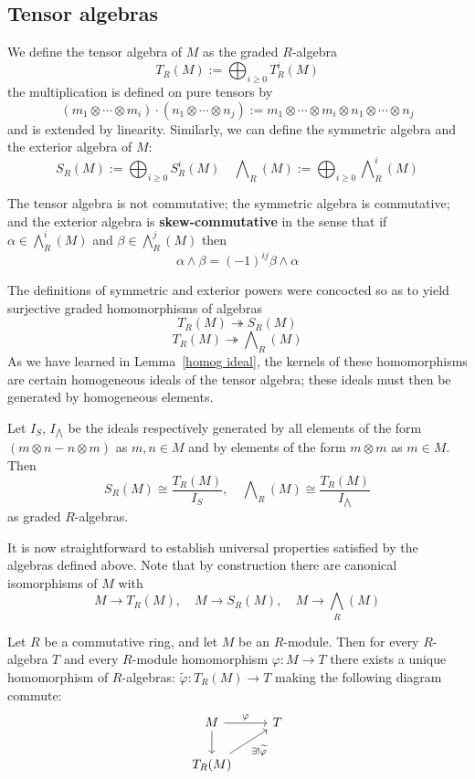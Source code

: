 \subsection{Tensor algebras}
We define the tensor algebra of $M$ as the graded $R$-algebra
\[T_R(M):=\bigoplus_{i\geq 0}T^i_R(M)\]
the multiplication is defined on pure tensors by
\[(m_1\otimes\cdots\otimes m_i)\cdot(n_1\otimes\cdots\otimes n_j):=m_1\otimes\cdots\otimes m_i\otimes n_1\otimes\cdots\otimes n_j\]
and is extended by linearity. Similarly, we can define the symmetric algebra and the exterior algebra of $M$:
\[S_R(M):=\bigoplus_{i\geq0}S_R^i(M)\quad \bigwedge\nolimits_R(M):=\bigoplus_{i\geq0}\bigwedge\nolimits^i_R(M)\]
\begin{remark}
The tensor algebra is not commutative; the symmetric algebra is commutative; and the exterior algebra is \textbf{skew-commutative} in the sense that if $\alpha\in\bigwedge^i_R(M)$ and $\beta\in\bigwedge^j_R(M)$ then
\[\alpha\wedge\beta=(-1)^{ij}\beta\wedge\alpha\]	
\end{remark}
The definitions of symmetric and exterior powers were concocted so as to yield surjective graded homomorphisms of algebras
\[T_R(M)\twoheadrightarrow S_R(M)\]
\[T_R(M)\twoheadrightarrow\bigwedge\nolimits_R(M)\]
As we have learned in Lemma~\ref{homog ideal}, the kernels of these homomorphisms are certain
homogeneous ideals of the tensor algebra; these ideals must then be generated by homogeneous elements.
\begin{lemma}
Let $I_S$, $I_{\bigwedge}$ be the ideals respectively generated by all elements of the form $(m\otimes n-n\otimes m)$ as $m,n\in M$ and by elements of the form $m\otimes m$ as $m\in M$. Then
\[S_R(M)\cong\dfrac{T_R(M)}{I_S},\quad \bigwedge\nolimits_R(M)\cong\dfrac{T_R(M)}{I_{\bigwedge}}\]
as graded $R$-algebras.
\end{lemma}
It is now straightforward to establish universal properties satisfied by the algebras defined above. Note that by construction there are canonical isomorphisms of $M$ with
\[M\to T_R(M),\quad M\to S_R(M),\quad M\to\bigwedge_R(M)\]
\begin{proposition}
Let $R$ be a commutative ring, and let $M$ be an $R$-module. Then for every $R$-algebra $T$ and every $R$-module homomorphism $\varphi:M\to T$ there exists a unique homomorphism of $R$-algebras: $\widetilde{\varphi}:T_R(M)\to T$ making the following diagram commute:
\[\begin{tikzcd}
M\ar[d]\ar[r,"\varphi"]&T\\
T_R(M)\ar[ru,swap,"\exists !\widetilde{\varphi}"]
\end{tikzcd}\]
\end{proposition}

